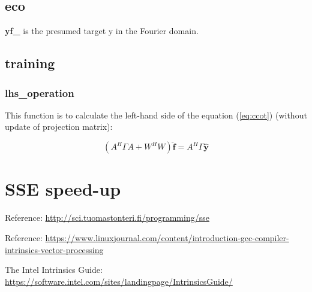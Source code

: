 \documentclass[12pt]{article}
\numberwithin{equation}{section}
\begin{document}
{\subsection{eco}
\textbf{yf\_} is the presumed target y in the Fourier domain. 
\subsection{training}
\subsubsection{lhs\_operation}
This function is to calculate the left-hand side of the equation (\ref{eq:ccot}) (without update of projection matrix): \par
\begin{equation} 
	(A^H \Gamma A + W^H W) \hat{\bm{f}} = A^H \Gamma \hat{\bm{y}}
\end{equation} \par

\section{SSE speed-up}
Reference: \url{http://sci.tuomastonteri.fi/programming/sse} \par
Reference: \url{https://www.linuxjournal.com/content/introduction-gcc-compiler-intrinsics-vector-processing} \par
The Intel Intrinsics Guide: \url{https://software.intel.com/sites/landingpage/IntrinsicsGuide/} \par
}
\end{document}
